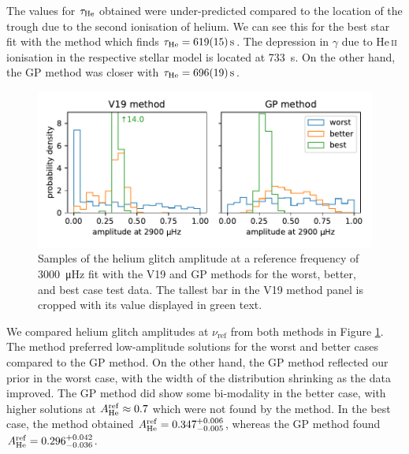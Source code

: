 The values for \(\tau_\helium\) obtained were under-predicted compared to the location of the trough due to the second ionisation of helium. We can see this for the best star fit with the  method which finds \(\tau_\helium = \SI{619(15)}{\second}\). The depression in \(\gamma\) due to He\,\textsc{ii} ionisation in the respective stellar model is located at \SI{733}{\second}. On the other hand, the GP method was closer with \(\tau_\helium = \SI{696(19)}{\second}\).

\begin{figure}[tb]
    \centering
    \includegraphics{figures/glitch-test-amplitude.pdf}
    \caption[Samples of the helium glitch amplitude at a reference frequency of \SI{3000}{\micro\hertz} fit with the V19 and GP methods for the worst, better, and best case test data.]{Samples of the helium glitch amplitude at a reference frequency of \SI{3000}{\micro\hertz} fit with the V19 and GP methods for the worst, better, and best case test data. The tallest bar in the V19 method panel is cropped with its value displayed in green text.}
    \label{fig:glitch-test-amplitude}
\end{figure}

We compared helium glitch amplitudes at \(\nu_\mathrm{ref}\) from both methods in Figure \ref{fig:glitch-test-amplitude}. The  method preferred low-amplitude solutions for the worst and better cases compared to the GP method. On the other hand, the GP method reflected our prior in the worst case, with the width of the distribution shrinking as the data improved. The GP method did show some bi-modality in the better case, with higher solutions at \(A_\helium^\mathrm{ref} \approx 0.7\) which were not found by the  method. In the best case, the  method obtained \(A_\helium^\mathrm{ref} = 0.347_{-0.005}^{+0.006}\), whereas the GP method found \(A_\helium^\mathrm{ref} = 0.296_{-0.036}^{+0.042}\).

